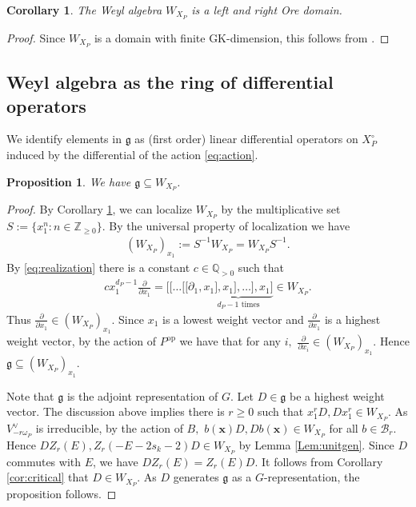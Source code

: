 \documentclass[11pt,a4paper,usenames,dvipsnames,reqno]{amsart}
\numberwithin{equation}{section}
\newcommand{\zz}{\mathbb Z}
\newcommand{\qq}{\mathbb Q}
\newcommand{\fg}{\mathfrak g}
\newtheorem{Prop}[Thm]{Proposition}
\newtheorem{Cor}[Thm]{Corollary}
\theoremstyle{definition}
\theoremstyle{remark}
\begin{document}
\begin{Cor}\label{cor:Ore}
The Weyl algebra $W_{X_P}$ is a left and right Ore domain.  
\end{Cor}

\begin{proof}
    Since $W_{X_P}$ is a domain with finite GK-dimension, this follows from \cite[Theorem 8.1.21]{noncomm}.
\end{proof}


\subsection{Weyl algebra as the ring of differential operators} 
We identify elements in $\mathfrak{g}$ as (first order) linear differential operators on $X_P^\circ$ induced by the differential of the action \eqref{eq:action}.

\begin{Prop}\label{prop:liecontained}
    We have $\mathfrak{g}\subseteq W_{X_P}$.
\end{Prop}

\begin{proof}
 By Corollary \ref{cor:Ore}, we can localize $W_{X_P}$ by the multiplicative set $S:=\{x_1^n:n\in \zz_{\ge 0}\}$. By the universal property of localization \cite[Corollary 2.1.4]{noncomm} we have
 \begin{align*}
     (W_{X_P})_{x_1}:=S^{-1}W_{X_P}=W_{X_P}S^{-1}.
 \end{align*}
By \eqref{eq:realization} there is a constant $c\in \qq_{>0}$ such that
\begin{align*}
    cx_1^{d_P-1}\frac{\partial}{\partial x_1}=[[\ldots[[\partial_1,\underbrace{x_1],x_1],\ldots], x_1]}_{d_P-1 \textrm{ times}}\in W_{X_P}.
\end{align*}
Thus $ \tfrac{\partial}{\partial x_1}\in  (W_{X_P})_{x_1}.$ Since $x_1$ is a lowest weight vector and $\tfrac{\partial}{\partial x_1}$ is a highest weight vector, by the action of $P^{\mathrm{op}}$ we have that for any $i,$ $\tfrac{\partial}{\partial x_i}\in (W_{X_P})_{x_1}.$ Hence $\mathfrak{g}\subseteq  (W_{X_P})_{x_1}.$ 

Note that $\mathfrak{\fg}$ is the adjoint representation of $G$. Let $D\in \fg$ be a highest weight vector. The discussion above implies there is $r\ge 0$ such that $x_1^rD, Dx_1^r\in W_{X_P}$. As $V_{-r\omega_P}^\lor$ is irreducible, by the action of $B,$ $b(\mathbf{x})D,  Db(\mathbf{x}) \in W_{X_P}$ for all $b\in \mathcal{B}_r.$   Hence $DZ_r(E),Z_r(-E-2s_k-2)D\in W_{X_P}$ by Lemma \ref{Lem:unitgen}. Since $D$ commutes with $E$, we have $DZ_r(E)=Z_r(E)D$. It follows from Corollary \ref{cor:critical} that $D\in W_{X_P}$. As $D$ generates $\fg$ as a $G$-representation, the proposition follows.
\end{proof}
\end{document}
